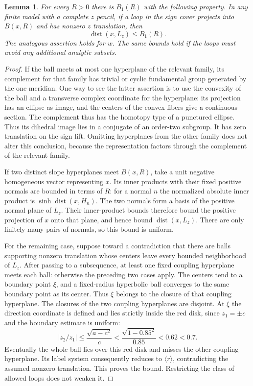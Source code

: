 \documentclass[11pt,reqno]{amsart}
\numberwithin{equation}{section}
\newtheorem{lemma}[theorem]{Lemma}
\theoremstyle{definition}
\theoremstyle{remark}
\DeclareMathOperator{\dist}{dist}
\begin{document}
\begin{lemma}\label{mod:buffer-bound}
For every $R>0$ there is $B_1(R)$ with the following property.
In any finite model with a complete $z$ pencil, if a loop in the
sign cover projects into $B(x,R)$ and has nonzero $z$ translation,
then
\[
 \dist(x,L_z)\le B_1(R).
\]
The analogous assertion holds for $w$.  The same bounds hold if
the loops must avoid any additional analytic subsets.
\end{lemma}
\begin{proof}
If the ball meets at most one hyperplane of the relevant family,
its complement for that family has trivial or cyclic fundamental
group generated by the one meridian.  One way to see the latter
assertion is to use the convexity of the ball and a transverse
complex coordinate for the hyperplane: its projection has an
ellipse as image, and the centers of the convex fibers give a
continuous section.  The complement thus has the homotopy type
of a punctured ellipse.  Thus its dihedral image lies in a
conjugate of an order-two subgroup.  It has zero translation on
the sign lift.  Omitting hyperplanes from the other family does
not alter this conclusion, because the representation factors
through the complement of the relevant family.

If two distinct slope hyperplanes meet $B(x,R)$, take a unit
negative homogeneous vector representing $x$.  Its inner products
with their fixed positive normals are bounded in terms of $R$:
for a normal $n$ the normalized absolute inner product is
$\sinh\dist(x,H_n)$.  The two normals form a basis of the positive
normal plane of $L_z$.  Their inner-product bounds therefore bound
the positive projection of $x$ onto that plane, and hence bound
$\dist(x,L_z)$.  There are only finitely many pairs of normals,
so this bound is uniform.

For the remaining case, suppose toward a contradiction that there
are balls supporting nonzero translation whose centers leave every
bounded neighborhood of $L_z$.  After passing to a subsequence,
at least one fixed coupling hyperplane meets each ball: otherwise
the preceding two cases apply.  The centers tend to a boundary
point $\xi$, and a fixed-radius hyperbolic ball converges to the
same boundary point as its center.  Thus $\xi$ belongs to the
closure of that coupling hyperplane.  The closures of the two
coupling hyperplanes are disjoint.  At $\xi$ the direction coordinate
is defined and lies strictly inside the red disk, since $z_1=\pm c$
and the boundary estimate is uniform:
\[
 |z_2/z_1|\le\frac{\sqrt{a-c^2}}{c}
 <\frac{\sqrt{1-0.85^2}}{0.85}<0.62<0.7.
\]
Eventually the whole ball lies over this red disk and misses the
other coupling hyperplane.  Its label system consequently reduces
to $\langle r\rangle$, contradicting the assumed nonzero
translation.  This proves the bound.  Restricting the class of
allowed loops does not weaken it.
\end{proof}
\end{document}
